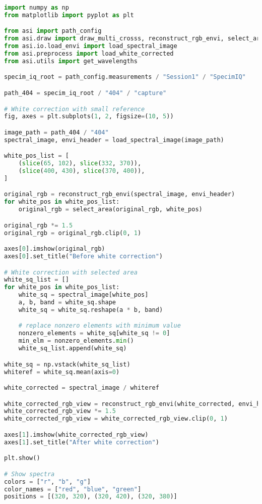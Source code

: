 \begin{lstlisting}[language=python, caption=White correction for SpecimIQ with small reference, label={code:wc-specimiq-small}]
import numpy as np
from matplotlib import pyplot as plt

from asi import path_config
from asi.draw import draw_multi_crosss, reconstruct_rgb_envi, select_area
from asi.io.load_envi import load_spectral_image
from asi.preprocess import load_white_corrected
from asi.utils import get_wavelengths

specim_iq_root = path_config.measurements / "Session1" / "SpecimIQ"

path_404 = specim_iq_root / "404" / "capture"

# White correction with small reference
fig, axes = plt.subplots(1, 2, figsize=(10, 5))

image_path = path_404 / "404"
spectral_image, envi_header = load_spectral_image(image_path)

white_pos_list = [
    (slice(65, 102), slice(332, 370)),
    (slice(400, 430), slice(370, 400)),
]

original_rgb = reconstruct_rgb_envi(spectral_image, envi_header)
for white_pos in white_pos_list:
    original_rgb = select_area(original_rgb, white_pos)

original_rgb *= 1.5
original_rgb = original_rgb.clip(0, 1)

axes[0].imshow(original_rgb)
axes[0].set_title("Before white correction")

# White correction with selected area
white_sq_list = []
for white_pos in white_pos_list:
    white_sq = spectral_image[white_pos]
    a, b, band = white_sq.shape
    white_sq = white_sq.reshape(a * b, band)

    # replace nonzero elements with minimum value
    nonzero_elements = white_sq[white_sq != 0]
    min_elm = nonzero_elements.min()
    white_sq_list.append(white_sq)

white_sq = np.vstack(white_sq_list)
whiteref = white_sq.mean(axis=0)

white_corrected = spectral_image / whiteref

white_corrected_rgb_view = reconstruct_rgb_envi(white_corrected, envi_header)
white_corrected_rgb_view *= 1.5
white_corrected_rgb_view = white_corrected_rgb_view.clip(0, 1)

axes[1].imshow(white_corrected_rgb_view)
axes[1].set_title("After white correction")

plt.show()

# Show spectra
colors = ["r", "b", "g"]
color_names = ["red", "blue", "green"]
positions = [(320, 320), (320, 420), (320, 380)]


\end{lstlisting}

